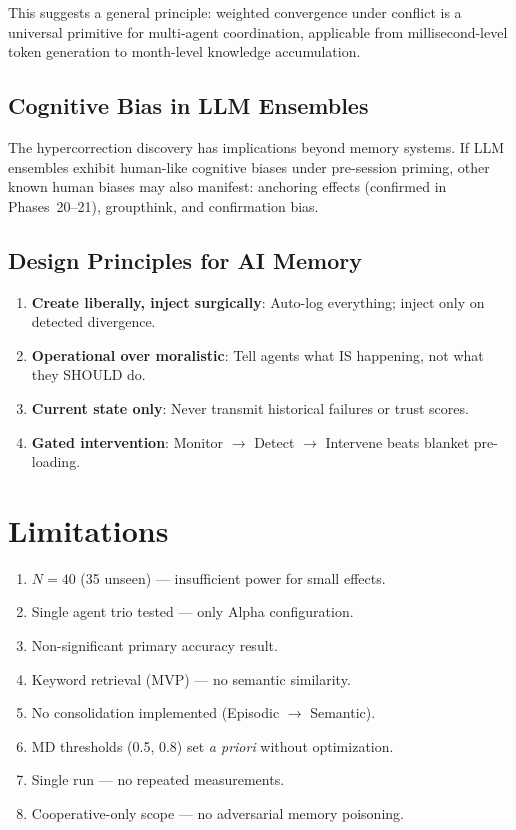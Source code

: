 \documentclass[11pt,a4paper]{article}
\begin{document}
This suggests a general principle: weighted convergence under conflict
is a universal primitive for multi-agent coordination, applicable from
millisecond-level token generation to month-level knowledge
accumulation.

\subsection{Cognitive Bias in LLM Ensembles}

The hypercorrection discovery has implications beyond memory systems.
If LLM ensembles exhibit human-like cognitive biases under pre-session
priming, other known human biases may also manifest: anchoring effects
(confirmed in Phases~20--21), groupthink, and confirmation bias.

\subsection{Design Principles for AI Memory}

\begin{enumerate}
  \item \textbf{Create liberally, inject surgically}: Auto-log
    everything; inject only on detected divergence.
  \item \textbf{Operational over moralistic}: Tell agents what IS
    happening, not what they SHOULD do.
  \item \textbf{Current state only}: Never transmit historical
    failures or trust scores.
  \item \textbf{Gated intervention}: Monitor $\to$ Detect $\to$
    Intervene beats blanket pre-loading.
\end{enumerate}

\section{Limitations}\label{sec:limitations}

\begin{enumerate}
  \item $N = 40$ (35 unseen) --- insufficient power for small effects.
  \item Single agent trio tested --- only Alpha configuration.
  \item Non-significant primary accuracy result.
  \item Keyword retrieval (MVP) --- no semantic similarity.
  \item No consolidation implemented (Episodic $\to$ Semantic).
  \item MD thresholds (0.5, 0.8) set \textit{a priori} without
    optimization.
  \item Single run --- no repeated measurements.
  \item Cooperative-only scope --- no adversarial memory poisoning.
\end{enumerate}
\end{document}

